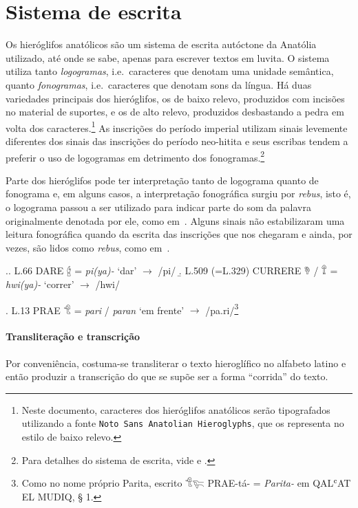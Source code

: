 
\section{Sistema de escrita}

Os hieróglifos anatólicos são um sistema de escrita autóctone da Anatólia
utilizado, até onde se sabe, apenas para escrever textos em luvita.
O sistema utiliza tanto \emph{logogramas}, i.e.\ caracteres que denotam uma
unidade semântica, quanto \emph{fonogramas}, i.e.\ caracteres que denotam sons da
língua.
Há duas variedades principais dos hieróglifos, os de baixo relevo, produzidos
com incisões no material de suportes, e os de alto relevo, produzidos
desbastando a pedra em volta dos caracteres.\footnote{Neste documento, 
	caracteres dos hieróglifos anatólicos serão tipografados utilizando a fonte 
	{\tiny\texttt{Noto Sans Anatolian Hieroglyphs}}, que os representa no estilo de 
baixo relevo.}
As inscrições do período imperial utilizam sinais levemente diferentes dos
sinais das inscrições do período neo-hitita e seus escribas tendem a preferir 
o uso de logogramas em detrimento dos fonogramas.\footnote{%
	Para detalhes do sistema de escrita, vide
	\textcite[pp.\ 6ff.\ e pp.\ 23ff.]{CHLI11} e \textcite[pp. 354ff.]{CHLI3}.}

	
Parte dos hieróglifos pode ter interpretação tanto de logograma quanto de
fonograma e, em alguns casos, a interpretação fonográfica surgiu por
\emph{rebus}, isto é, o logograma passou a ser utilizado para indicar parte do
som da palavra originalmente denotada por ele, como em~\Next.
Alguns sinais não estabilizaram uma leitura fonográfica quando da escrita das
inscrições que nos chegaram e ainda, por vezes, são lidos como \emph{rebus},
como em~\NNext.

\ex.\a. L.66 DARE 𔑈 = \emph{pi{(ya)}-} `dar' $\rightarrow$ /pi/
\b. L.509 (=L.329) CURRERE 𔘰 \slash{} 𔕰 = \emph{hwi{(ya)}-} `correr' $\rightarrow$
/hwi/

\ex. L.13 PRAE 𔐎 = \emph{pari} \slash{} \emph{paran} `em frente' $\rightarrow$
/pa.ri/\footnote{Como no nome próprio Parita, escrito 𔐎𔐞 PRAE-tá- =
\emph{Parita-} em QALʿAT EL MUDIQ, § 1.}

\paragraph{Transliteração e transcrição}
Por conveniência, costuma-se transliterar o texto hieroglífico no alfabeto latino
e então produzir a transcrição do que se supõe ser a forma ``corrida'' do texto.

